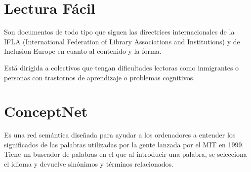 \section{Lectura Fácil}

Son documentos de todo tipo que siguen las directrices internacionales de la IFLA (International Federation of Library Associations and Institutions) y de Inclusion Europe en cuanto al contenido y la forma.

Está dirigida a colectivos que tengan dificultades lectoras como inmigrantes o personas con trastornos de aprendizaje o problemas cognitivos.

\section{ConceptNet} 

Es una red semántica diseñada para ayudar a los ordenadores a entender los significados de las palabras utilizadas por la gente lanzada por el MIT en 1999.
Tiene un buscador de palabras en el que al introducir una palabra, se selecciona el idioma y devuelve sinónimos y términos relacionados.

